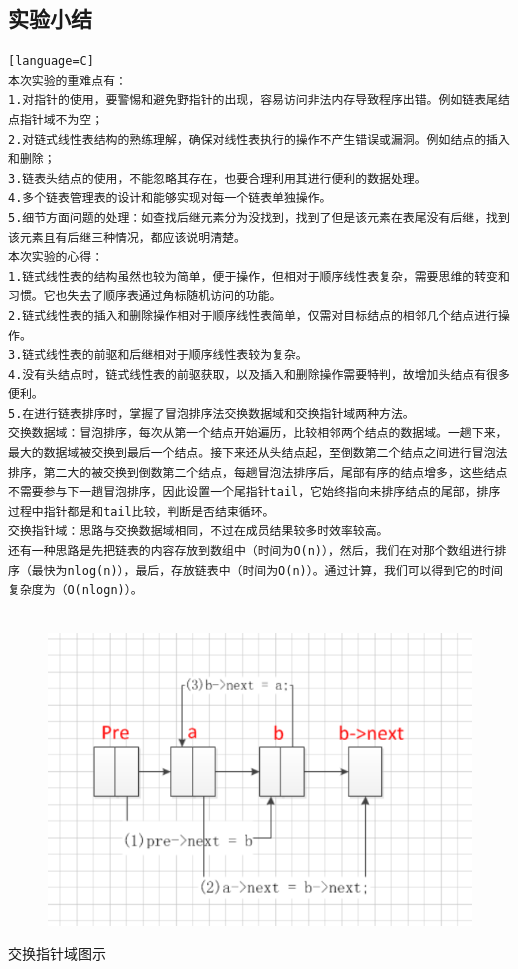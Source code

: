 \documentclass[supercite]{Experimental_Report}
\theoremstyle{definition}
\begin{document}
\begin{sloppypar}
\subsection{实验小结}
\begin{lstlisting}[breaklines][language=C]
本次实验的重难点有：
1.对指针的使用，要警惕和避免野指针的出现，容易访问非法内存导致程序出错。例如链表尾结点指针域不为空；
2.对链式线性表结构的熟练理解，确保对线性表执行的操作不产生错误或漏洞。例如结点的插入和删除；
3.链表头结点的使用，不能忽略其存在，也要合理利用其进行便利的数据处理。
4.多个链表管理表的设计和能够实现对每一个链表单独操作。
5.细节方面问题的处理：如查找后继元素分为没找到，找到了但是该元素在表尾没有后继，找到该元素且有后继三种情况，都应该说明清楚。
本次实验的心得：
1.链式线性表的结构虽然也较为简单，便于操作，但相对于顺序线性表复杂，需要思维的转变和习惯。它也失去了顺序表通过角标随机访问的功能。
2.链式线性表的插入和删除操作相对于顺序线性表简单，仅需对目标结点的相邻几个结点进行操作。
3.链式线性表的前驱和后继相对于顺序线性表较为复杂。
4.没有头结点时，链式线性表的前驱获取，以及插入和删除操作需要特判，故增加头结点有很多便利。
5.在进行链表排序时，掌握了冒泡排序法交换数据域和交换指针域两种方法。
交换数据域：冒泡排序，每次从第一个结点开始遍历，比较相邻两个结点的数据域。一趟下来，最大的数据域被交换到最后一个结点。接下来还从头结点起，至倒数第二个结点之间进行冒泡法排序，第二大的被交换到倒数第二个结点，每趟冒泡法排序后，尾部有序的结点增多，这些结点不需要参与下一趟冒泡排序，因此设置一个尾指针tail，它始终指向未排序结点的尾部，排序过程中指针都是和tail比较，判断是否结束循环。
交换指针域：思路与交换数据域相同，不过在成员结果较多时效率较高。
还有一种思路是先把链表的内容存放到数组中（时间为O(n)），然后，我们在对那个数组进行排序（最快为nlog(n)），最后，存放链表中（时间为O(n)）。通过计算，我们可以得到它的时间复杂度为（O(nlogn)）。
 
\end{lstlisting}
\begin{figure}[H]
	\includegraphics[width=16cm]{pic2//xianglin.png}
\end{figure}
交换指针域图示

\end{sloppypar}
\end{document}
